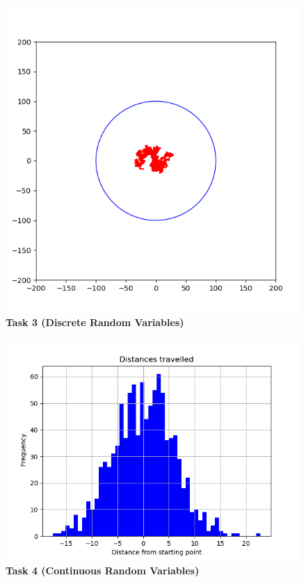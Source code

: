 \documentclass{article}
\begin{document}
    \begin{figure}[H]
        \includegraphics[width=15cm]{Graphs/task3.png}
        \centering
        \caption{\textbf{Task 3 (Discrete Random Variables)}}
    \end{figure}
    \begin{figure}[H]
        \includegraphics[width=15cm]{Graphs/task4.png}
        \centering
        \caption{\textbf{Task 4 (Continuous Random Variables)}}
    \end{figure}
\end{document}
